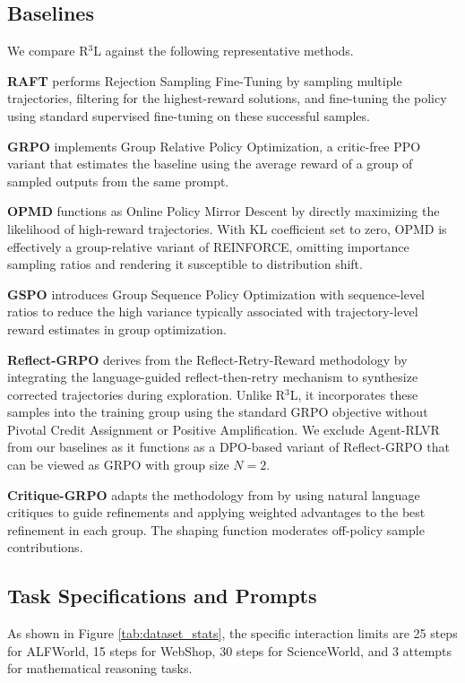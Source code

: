 \subsection{Baselines}
We compare R$^3$L against the following representative methods.

\textbf{RAFT} \cite{dongraft} performs Rejection Sampling Fine-Tuning by sampling multiple trajectories, filtering for the highest-reward solutions, and fine-tuning the policy using standard supervised fine-tuning on these successful samples.

\textbf{GRPO} \cite{shao2024deepseekmath} implements Group Relative Policy Optimization, a critic-free PPO variant that estimates the baseline using the average reward of a group of sampled outputs from the same prompt.

\textbf{OPMD} \cite{yao2025group} functions as Online Policy Mirror Descent by directly maximizing the likelihood of high-reward trajectories. With KL coefficient set to zero, OPMD is effectively a group-relative variant of REINFORCE, omitting importance sampling ratios and rendering it susceptible to distribution shift.

\textbf{GSPO} \cite{zheng2025group} introduces Group Sequence Policy Optimization with sequence-level ratios to reduce the high variance typically associated with trajectory-level reward estimates in group optimization.

\textbf{Reflect-GRPO} derives from the Reflect-Retry-Reward methodology \cite{bensal2025reflect} by integrating the language-guided reflect-then-retry mechanism to synthesize corrected trajectories during exploration. Unlike R$^3$L, it incorporates these samples into the training group using the standard GRPO objective without Pivotal Credit Assignment or Positive Amplification. We exclude Agent-RLVR \cite{da2025agent} from our baselines as it functions as a DPO-based variant of Reflect-GRPO that can be viewed as GRPO with group size $N=2$.

\textbf{Critique-GRPO} adapts the methodology from \cite{zhang2025critique} by using natural language critiques to guide refinements and applying weighted advantages to the best refinement in each group. The shaping function moderates off-policy sample contributions.

\subsection{Task Specifications and Prompts}
As shown in Figure \ref{tab:dataset_stats}, the specific interaction limits are 25 steps for ALFWorld, 15 steps for WebShop, 30 steps for ScienceWorld, and 3 attempts for mathematical reasoning tasks.

